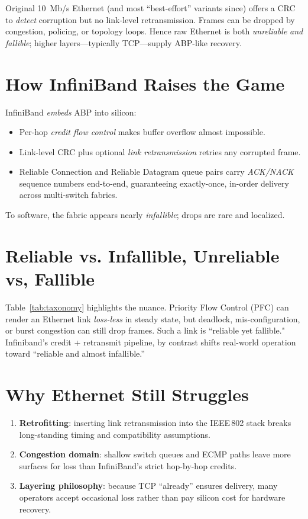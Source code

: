 {{{{{{Original 10~Mb/s Ethernet (and most ``best-effort'' variants since) offers a
CRC to \emph{detect} corruption but no link-level
retransmission. Frames can be dropped by congestion, policing, or topology
loops. Hence raw Ethernet is both \emph{unreliable} \emph{and} \emph{fallible};
higher layers---typically TCP---supply ABP-like recovery.

\section{How InfiniBand Raises the Game}

InfiniBand \emph{embeds} ABP into silicon:

\begin{itemize}
\item Per-hop \emph{credit flow control} makes buffer overflow almost
      impossible.
\item Link-level CRC plus optional \emph{link retransmission} retries any
      corrupted frame.
\item Reliable Connection and Reliable Datagram queue pairs carry
      \emph{ACK/NACK} sequence numbers end-to-end, guaranteeing exactly-once,
      in-order delivery across multi-switch fabrics.
\end{itemize}

To software, the fabric appears nearly \emph{infallible}; drops are rare and localized.

\section{Reliable vs. Infallible, Unreliable vs, Fallible}

Table~\ref{tab:taxonomy} highlights the nuance.  Priority Flow Control (PFC)
can render an Ethernet link \emph{loss-less} in steady state, but deadlock,
mis-configuration, or burst congestion can still drop frames.  Such a link is
``reliable yet fallible." Infiniband's credit + retransmit pipeline, by contrast
shifts real-world operation toward ``reliable and almost infallible.''

\section{Why Ethernet Still Struggles}

\begin{enumerate}
\item \textbf{Retrofitting}: inserting link retransmission into the IEEE\,802
      stack breaks long-standing timing and compatibility assumptions.
\item \textbf{Congestion domain}: shallow switch queues and ECMP paths leave
      more surfaces for loss than InfiniBand’s strict hop-by-hop credits.
\item \textbf{Layering philosophy}: because TCP ``already'' ensures delivery,
      many operators accept occasional loss rather than pay silicon cost for
      hardware recovery.
\end{enumerate}

}}}}}}
